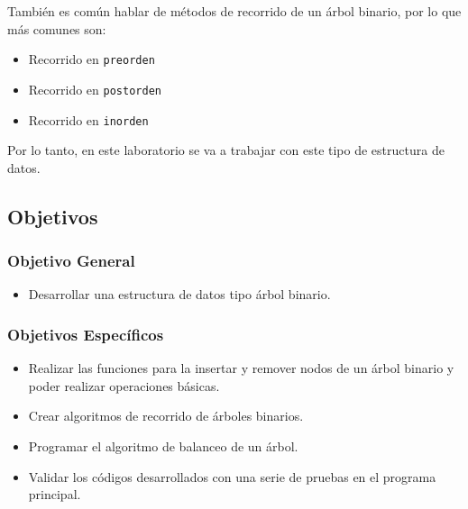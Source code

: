 También es común hablar de métodos de recorrido de un árbol binario, por lo que más comunes son:

\begin{itemize}
    \item Recorrido en \texttt{preorden}
    \item Recorrido en \texttt{postorden}
    \item Recorrido en \texttt{inorden}
\end{itemize}

Por lo tanto, en este laboratorio se va a trabajar con este tipo de estructura de datos.




\subsection{Objetivos}

\subsubsection{Objetivo General}
\begin{itemize}
\item Desarrollar una estructura de datos tipo árbol binario. 
\end{itemize}

\subsubsection{Objetivos Específicos}
\begin{itemize}
\item Realizar las funciones para la insertar y remover nodos de un árbol binario y poder realizar operaciones básicas.
\item Crear algoritmos de recorrido de árboles binarios.
\item Programar el algoritmo de balanceo de un árbol.
\item Validar los códigos desarrollados con una serie de pruebas en el programa principal.
\end{itemize}

